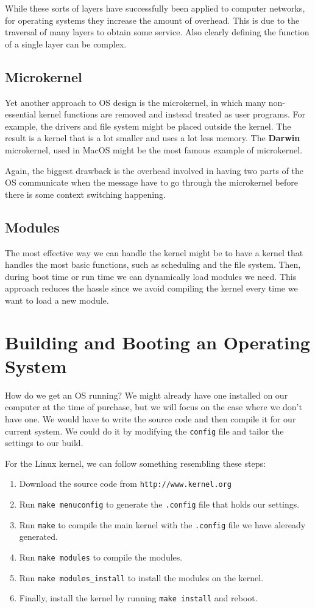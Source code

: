 \documentclass{tufte-handout}
\begin{document}
While these sorts of layers have successfully been applied to computer networks, 
for operating systems they increase the amount of overhead. This is due to the 
traversal of many layers to obtain some service. Also clearly defining the 
function of a single layer can be complex.

\subsection{Microkernel}
Yet another approach to OS design is the microkernel, in which many non-essential 
kernel functions are removed and instead treated as user programs. For example, the
drivers and file system might be placed outside the kernel. The result is a kernel 
that is a lot smaller and uses a lot less memory. The \textbf{Darwin} microkernel,
used in MacOS might be the most famous example of microkernel.

Again, the biggest drawback is the overhead involved in having two parts of the 
OS communicate when the message have to go through the microkernel before there is some
context switching happening.

\subsection{Modules}
The most effective way we can handle the kernel might be to have a kernel that 
handles the most basic functions, such as scheduling and the file system. Then,
during boot time or run time we can dynamically load modules we need. This approach
reduces the hassle since we avoid compiling the kernel every time we want to load
a new module.

\section{Building and Booting an Operating System}
How do we get an OS running? We might already have one installed on our computer
at the time of purchase, but we will focus on the case where we don't have one.
We would have to write the source code and then compile it for our current system.
We could do it by modifying the \texttt{config} file and tailor the settings to our
build.

For the Linux kernel, we can follow something resembling these steps:
\begin{enumerate}
	\item Download the source code from \texttt{http://www.kernel.org}
	\item Run \texttt{make menuconfig} to generate the \texttt{.config} file
			that holds our settings.
	\item Run \texttt{make} to compile the main kernel with the \texttt{.config} file
			we have aleready generated.
	\item Run \texttt{make modules} to compile the modules.
	\item Run \texttt{make modules\_install} to install the modules on the kernel.
	\item Finally, install the kernel by running \texttt{make install} and reboot.
\end{enumerate}
\end{document}
